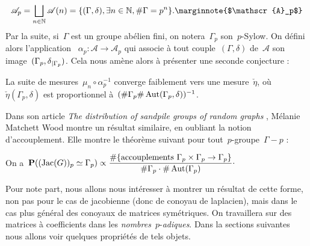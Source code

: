 	\[
		\mathscr{A}_p = \bigsqcup_{n\in\mathbb{N}} \mathscr{A}(n)
			= \{(\Gamma,\delta), \exists n\in\mathbb{N},\#\Gamma = p^n\}.
			\text{\marginnote{$\mathscr{A}_p$}}
	\]
	Par la suite, si~$\Gamma$ est un groupe abélien fini, on notera~$\Gamma_p$ son~$p$-Sylow. On défini alors l'application ~$\alpha_p : \mathscr{A} \rightarrow\mathscr{A}_p$ qui associe à tout couple~$(\Gamma,\delta)$ de~$\mathscr{A}$ son image~$(\Gamma_p,\delta{}_{|\Gamma_p})$. Cela nous amène alors à présenter une seconde conjecture :
	\begin{conj}
		La suite de mesures~$\mu_n\circ\alpha_p^{-1}$ converge faiblement vers une mesure~$\check{\eta}$, où~$\check{\eta}(\Gamma_p,\delta)$ est proportionnel à~$(\#\Gamma_p\#\operatorname{Aut}(\Gamma_p,\delta))^{-1}$.
	\end{conj}
	Dans son article \emph{The distribution of sandpile groups of random graphs} \cite{main},  Mélanie Matchett Wood montre un résultat similaire, en oubliant la notion d'accouplement. Elle montre le théorème suivant pour tout~$p$-groupe~$\Gamma-p$ :
	\begin{thm}
		On a~$\displaystyle \bm{\mathrm{P}}((\operatorname{Jac}(G))_p\simeq \Gamma_p) \propto \frac{\#\{\text{accouplements }\Gamma_p\times \Gamma_p\rightarrow \Gamma_p\}}{\#\Gamma_p \cdot \#\operatorname{Aut}(\Gamma_p)} \cdot$
	\end{thm}
	Pour note part, nous allons nous intéresser à montrer un résultat de cette forme, non pas pour le cas de jacobienne (donc de conoyau de laplacien), mais dans le cas plus général des conoyaux de matrices symétriques. On travaillera sur des matrices à coefficients dans les \emph{nombres}~$p$-\emph{adiques}. Dans la sections suivantes nous allons voir quelques propriétés de tels objets.
	